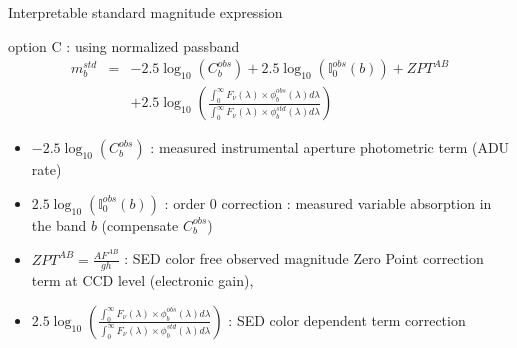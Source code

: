 \documentclass{beamer}
\begin{document}
\begin{frame}{Interpretable standard magnitude expression}
\begin{alertblock}{option C : using normalized passband}
\begin{eqnarray}
m_b^{std} & = &  -2.5 \log_{10}(C_b^{obs})+ 2.5 \log_{10}\left(\mathbb{I}_0^{obs}(b)\right) + ZPT^{AB}   \nonumber \\
 & & + 2.5 \log_{10} 
	\left( 
	\frac{\int_0^\infty F_\nu(\lambda) \times \phi_b^{obs}(\lambda) d\lambda }{\int_0^\infty F_\nu(\lambda) \times \phi_b^{std}(\lambda) d\lambda} 
	\right)
\end{eqnarray}
\end{alertblock}
\begin{itemize}
\item $-2.5 \log_{10}(C_b^{obs})$ : measured instrumental aperture photometric term (ADU rate)
\item $2.5 \log_{10}\left(\mathbb{I}_0^{obs}(b)\right)$ : order 0 correction : measured variable absorption in the band $b$ (compensate $C_b^{obs}$)
\item $ZPT^{AB} = \frac{A F^{AB}}{gh}$ :  SED color free observed magnitude Zero Point correction term at CCD level (electronic gain),
\item $2.5 \log_{10} 
	\left( 
	\frac{\int_0^\infty F_\nu(\lambda) \times \phi_b^{obs}(\lambda) d\lambda}{\int_0^\infty F_\nu(\lambda) \times \phi_b^{std}(\lambda) d\lambda}\right)$ : SED color dependent term correction
\end{itemize}
\end{frame}
\end{document}
